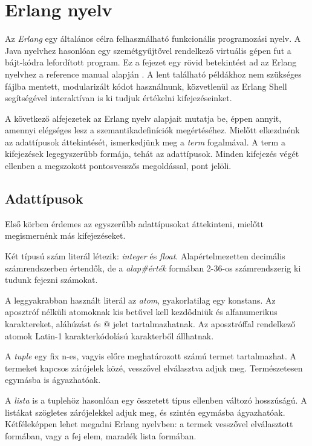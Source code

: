 \section{Erlang nyelv}
Az \textit{Erlang} egy általános célra felhasználható funkcionális programozási nyelv. A Java nyelvhez hasonlóan egy szemétgyűjtővel rendelkező virtuális gépen fut a bájt-kódra lefordított program. Ez a fejezet egy rövid betekintést ad az Erlang nyelvhez a reference manual alapján \cite{RefMan}. A lent található példákhoz nem szükséges fájlba mentett, modularizált kódot használnunk, közvetlenül az Erlang Shell segítségével interaktívan is ki tudjuk értékelni kifejezéseinket.

A következő alfejezetek az Erlang nyelv alapjait mutatja be, éppen annyit, amennyi elégséges lesz a szemantikadefiníciók megértéséhez. Mielőtt elkezdnénk az adattípusok áttekintését, ismerkedjünk meg a \textit{term} fogalmával. A term a kifejezések legegyszerűbb formája, tehát az adattípusok. Minden kifejezés végét ellenben a megszokott pontosvesszős megoldással, pont jelöli.

\subsection{Adattípusok}
Első körben érdemes az egyszerűbb adattípusokat áttekinteni, mielőtt megismernénk más kifejezéseket.

Két típusú szám literál létezik: \textit{integer} és \textit{float}. Alapértelmezetten decimális számrendszerben értendők, de a \textit{alap\#érték} formában 2-36-os számrendszerig ki tudunk fejezni számokat.



A leggyakrabban használt literál az \textit{atom}, gyakorlatilag egy konstans. Az aposztróf nélküli atomoknak kis betűvel kell kezdődniük és alfanumerikus karaktereket, aláhúzást és @ jelet tartalmazhatnak. Az aposztróffal rendelkező atomok Latin-1 karakterkódolású karakterből állhatnak.



A \textit{tuple} egy fix n-es, vagyis előre meghatározott számú termet tartalmazhat. A termeket kapcsos zárójelek közé, vesszővel elválasztva adjuk meg. Természetesen egymásba is ágyazhatóak.



A \textit{lista} is a tuplehöz hasonlóan egy összetett típus ellenben változó hosszúságú. A listákat szögletes zárójelekkel adjuk meg, és szintén egymásba ágyazhatóak. Kétféleképpen lehet megadni Erlang nyelvben: a termek vesszővel elválasztott formában, vagy a fej elem, maradék lista formában.

